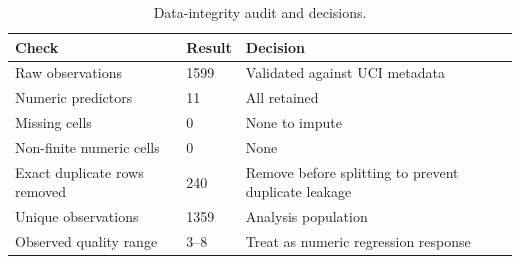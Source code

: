 \begin{table}

\caption{\label{tab:p1-data-audit}Data-integrity audit and decisions.}
\centering
\begin{tabular}[t]{lll}
\toprule
Check & Result & Decision\\
\midrule
Raw observations & 1599 & Validated against UCI metadata\\
Numeric predictors & 11 & All retained\\
Missing cells & 0 & None to impute\\
Non-finite numeric cells & 0 & None\\
Exact duplicate rows removed & 240 & Remove before splitting to prevent duplicate leakage\\
\addlinespace
Unique observations & 1359 & Analysis population\\
Observed quality range & 3--8 & Treat as numeric regression response\\
\bottomrule
\end{tabular}
\end{table}
